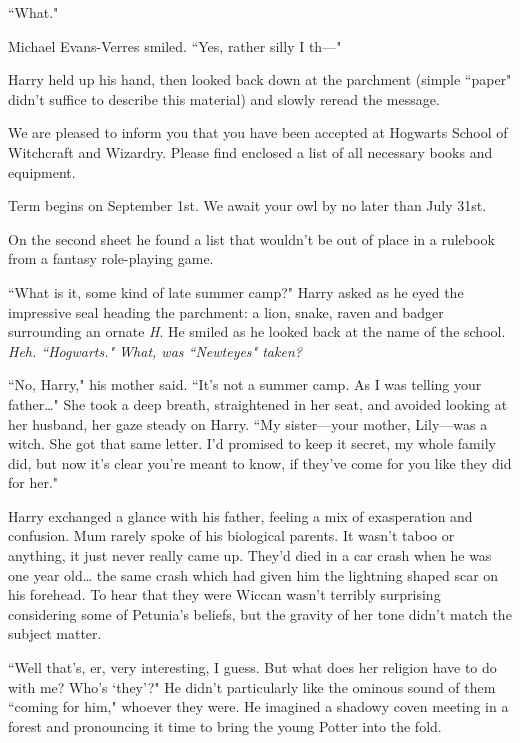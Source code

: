 ``What."

Michael Evans-Verres smiled. ``Yes, rather silly I th---"

Harry held up his hand, then looked back down at the parchment (simple ``paper" didn't suffice to describe this material) and slowly reread the message.

\begin{writtenNote}

We are pleased to inform you that you have been accepted at Hogwarts School of Witchcraft and Wizardry. Please find enclosed a list of all necessary books and equipment.

Term begins on September 1st. We await your owl by no later than July 31st.


\end{writtenNote}

On the second sheet he found a list that wouldn't be out of place in a rulebook from a fantasy role-playing game.

``What is it, some kind of late summer camp?" Harry asked as he eyed the impressive seal heading the parchment: a lion, snake, raven and badger surrounding an ornate \emph{H}. He smiled as he looked back at the name of the school. \emph{Heh. ``Hogwarts." What, was ``Newteyes" taken?}

``No, Harry," his mother said. ``It's not a summer camp. As I was telling your father{\ldots}" She took a deep breath, straightened in her seat, and avoided looking at her husband, her gaze steady on Harry. ``My sister---your mother, Lily---was a witch. She got that same letter. I'd promised to keep it secret, my whole family did, but now it's clear you're meant to know, if they've come for you like they did for her."

Harry exchanged a glance with his father, feeling a mix of exasperation and confusion. Mum rarely spoke of his biological parents. It wasn't taboo or anything, it just never really came up. They'd died in a car crash when he was one year old{\ldots} the same crash which had given him the lightning shaped scar on his forehead. To hear that they were Wiccan wasn't terribly surprising considering some of Petunia's beliefs, but the gravity of her tone didn't match the subject matter.

``Well that's, er, very interesting, I guess. But what does her religion have to do with me? Who's `they'?" He didn't particularly like the ominous sound of them ``coming for him," whoever they were. He imagined a shadowy coven meeting in a forest and pronouncing it time to bring the young Potter into the fold.

